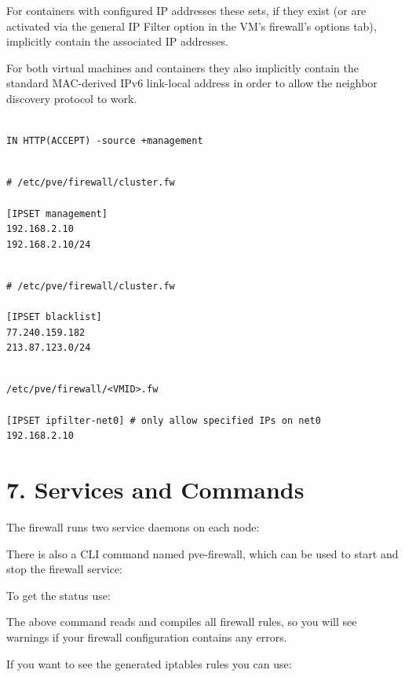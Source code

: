 For containers with configured IP addresses these sets, if they exist (or are activated via the general IP Filter option in the VM’s firewall’s options tab), implicitly contain the associated IP addresses.

For both virtual machines and containers they also implicitly contain the standard MAC-derived IPv6 link-local address in order to allow the neighbor discovery protocol to work.

\begin{lstlisting}

IN HTTP(ACCEPT) -source +management

\end{lstlisting}

\begin{lstlisting}

# /etc/pve/firewall/cluster.fw

[IPSET management]
192.168.2.10
192.168.2.10/24

\end{lstlisting}

\begin{lstlisting}

# /etc/pve/firewall/cluster.fw

[IPSET blacklist]
77.240.159.182
213.87.123.0/24

\end{lstlisting}

\begin{lstlisting}

/etc/pve/firewall/<VMID>.fw

[IPSET ipfilter-net0] # only allow specified IPs on net0
192.168.2.10

\end{lstlisting}


\section{7. Services and Commands}

The firewall runs two service daemons on each node:

There is also a CLI command named pve-firewall, which can be used to start and stop the firewall service:

To get the status use:

The above command reads and compiles all firewall rules, so you will see warnings if your firewall configuration contains any errors.

If you want to see the generated iptables rules you can use:


